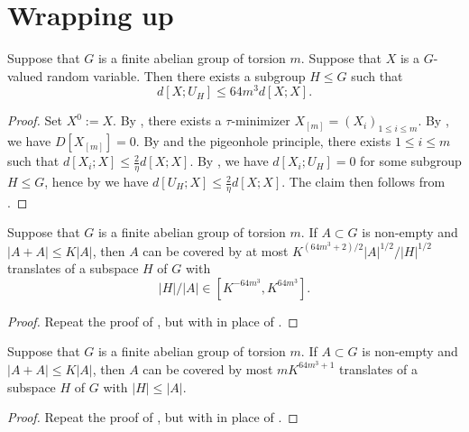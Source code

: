 \section{Wrapping up}

\begin{theorem}\label{main-entropy}\leanok Suppose that $G$ is a finite abelian group of torsion $m$.  Suppose that $X$ is a $G$-valued random variable. Then there exists a subgroup $H \leq G$ such that \[ d[X;U_H] \leq 64 m^3 d[X;X].\]
\end{theorem}

\begin{proof}  Set $X^0 := X$. By , there exists a $\tau$-minimizer $X_{[m]} = (X_i)_{1 \leq i \leq m}$.  By , we have $D[X_{[m]}]=0$. By  and the pigeonhole principle, there exists $1 \leq i \leq m$ such that $d[X_i; X] \leq \frac{2}{\eta} d[X;X]$.  By , we have $d[X_i;U_H]=0$ for some subgroup $H \leq G$, hence by  we have $d[U_H; X] \leq \frac{2}{\eta} d[X;X]$. The claim then follows from .
\end{proof}

\begin{lemma}\label{pfr_aux_torsion}\leanok  Suppose that $G$ is a finite abelian group of torsion $m$.  If $A \subset G$ is non-empty and
  $|A+A| \leq K|A|$, then $A$ can be covered by at most $K ^
  {(64m^3+2)/2}|A|^{1/2}/|H|^{1/2}$ translates of a subspace $H$ of $G$ with
  \begin{equation}
    \label{ah2}
    |H|/|A| \in [K^{-64m^3}, K^{64m^3}].
  \end{equation}
  \end{lemma}

\begin{proof}  Repeat the proof of , but with  in place of .
\end{proof}

\begin{theorem}[PFR]\label{pfr-torsion}\leanok  Suppose that $G$ is a finite abelian group of torsion $m$.
  If $A \subset G$ is non-empty and $|A+A| \leq K|A|$, then $A$ can be covered by most $mK^{64m^3+1}$ translates of a subspace $H$ of $G$ with $|H| \leq |A|$.
  \end{theorem}

  \begin{proof} Repeat the proof of , but with  in place of .
  \end{proof}
